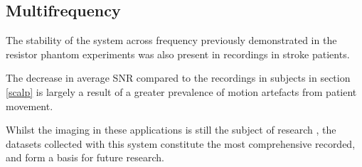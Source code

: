 \subsection{Multifrequency}
The stability of the system across frequency previously demonstrated in the resistor phantom experiments was also present in recordings in stroke patients. 

The decrease in average SNR compared to the recordings in subjects in section \ref{scalp} is largely a result of a greater prevalence of motion artefacts from patient movement. 


Whilst the imaging in these applications is still the subject of research \cite{malone2015} \cite{jang2015detection}, the datasets collected with this system constitute the most comprehensive recorded, and form a basis for future research. 

